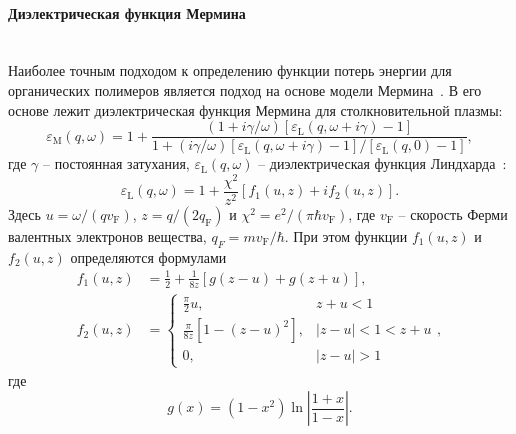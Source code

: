 \paragraph{Диэлектрическая функция Мермина} \mbox{} \\
\indent Наиболее точным подходом к определению функции потерь энергии для органических полимеров является подход на основе модели Мермина~\cite{Mermin}. В его основе лежит диэлектрическая функция Мермина для столкновительной плазмы:
\begin{equation}
	\varepsilon_\mathrm{M}(q, \omega)=1+\frac{(1+i \gamma / \omega)\left[\varepsilon_\mathrm{L}(q, \omega+i \gamma)-1\right]}{1+(i \gamma / \omega)\left[\varepsilon_\mathrm{L}(q, \omega+i \gamma)-1\right] /\left[\varepsilon_\mathrm{L}(q, 0)-1\right]},
\end{equation}
где $\gamma$ -- постоянная затухания, $\varepsilon_\mathrm{L}(q, \omega)$ -- диэлектрическая функция Линдхарда~\cite{Lindhard}:
\begin{equation}
	\varepsilon_\mathrm{L}(q, \omega)=1+\frac{\chi^2}{z^2}\left[f_1(u, z)+i f_2(u, z)\right].
\end{equation}
Здесь $u=\omega /\left(q v_\mathrm{F}\right)$, $z=q /\left( 2 q_\mathrm{F} \right)$ и $\chi^2=e^2 / \left( \pi \hbar v_\mathrm{F} \right)$, где $v_\mathrm{F}$
-- скорость Ферми валентных электронов вещества, $q_F=m v_\mathrm{F} / \hbar$. При этом функции $f_1(u, z)$ и $f_2(u, z)$ определяются формулами
\begin{equation}
	\begin{aligned}
		f_1(u, z) &=\frac{1}{2}+\frac{1}{8 z}[g(z-u)+g(z+u)], \\
		f_2(u, z) &= \begin{cases}\frac{\pi}{2} u, & z+u<1 \\
			\frac{\pi}{8 z}\left[1-(z-u)^2\right], & |z-u|<1<z+u \\
			0, & |z-u|>1\end{cases},
	\end{aligned}
\end{equation}
где
\begin{equation}
	g(x)=\left(1-x^2\right) \ln \left|\frac{1+x}{1-x}\right|.
\end{equation}

